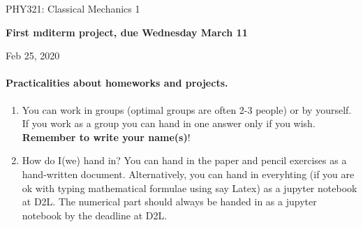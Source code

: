 \documentclass[%
oneside,                 %
final,                   %
10pt]{article}
\begin{document}

\newcommand{\exercisesection}[1]{\subsection*{#1}}






\thispagestyle{empty}

\begin{center}
{\LARGE\bf
\begin{spacing}{1.25}
PHY321: Classical Mechanics 1
\end{spacing}
}
\end{center}


\begin{center}
{\bf First mditerm project, due Wednesday March 11${}^{}$} \\ [0mm]
\end{center}

\begin{center}
\end{center}
    

\begin{center}
Feb 25, 2020
\end{center}

\vspace{1cm}


\paragraph{Practicalities about  homeworks and projects.}
\begin{enumerate}
\item You can work in groups (optimal groups are often 2-3 people) or by yourself. If you work as a group you can hand in one answer only if you wish. \textbf{Remember to write your name(s)}!

\item How do I(we)  hand in?  You can hand in the paper and pencil exercises as a hand-written document. Alternatively, you can hand in everyhting (if you are ok with typing mathematical formulae using say Latex) as a jupyter notebook at D2L. The numerical part should always be handed in as a jupyter notebook by the deadline at D2L. 
\end{enumerate}
\end{document}
